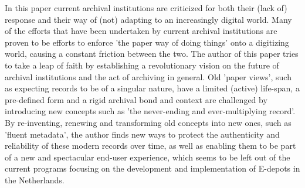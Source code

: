 


\begin{abstracts}        %

In this paper current archival institutions are criticized for both their (lack of) response and their way of (not) adapting to an increasingly digital world. Many of the efforts that have been undertaken by current archival institutions are proven to be efforts to enforce 'the paper way of doing things' onto a digitizing world, causing a constant friction between the two. The author of this paper tries to take a leap of faith by establishing a revolutionary vision on the future of archival institutions and the act of archiving in general. Old 'paper views', such as expecting records to be of a singular nature, have a limited (active) life-span, a pre-defined form and a rigid archival bond and context are challenged by introducing new concepts such as 'the never-ending and ever-multiplying record'. By re-inventing, renewing and transforming old concepts into new ones, such as 'fluent metadata', the author finds new ways to protect the authenticity and reliability of these modern records over time, as well as enabling them to be part of a new and spectacular end-user experience, which seems to be left out of the current programs focusing on the development and implementation of E-depots in the Netherlands. 

\end{abstracts}


